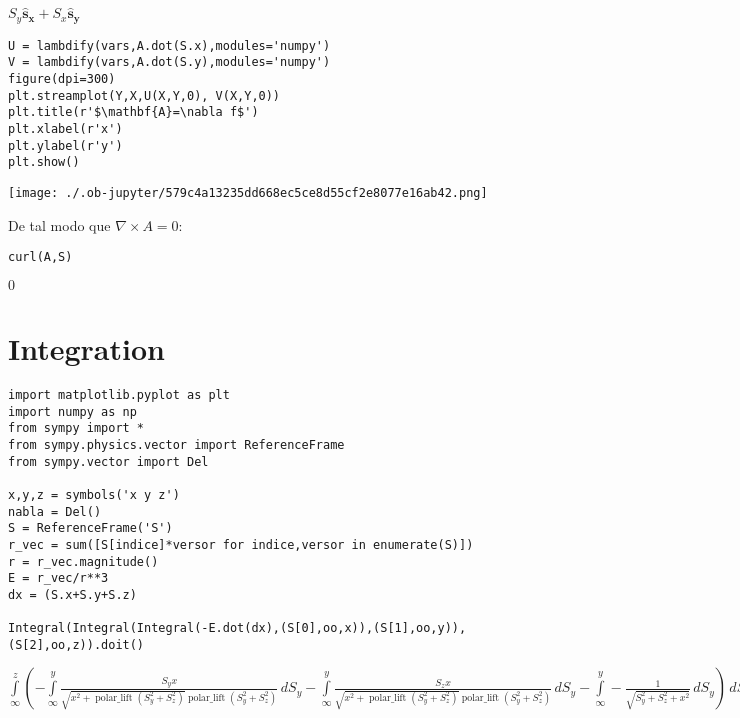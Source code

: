 \documentclass[11pt]{article}
\begin{document}
$\displaystyle S_{y}\mathbf{\hat{s}_x} + S_{x}\mathbf{\hat{s}_y}$

\begin{verbatim}
U = lambdify(vars,A.dot(S.x),modules='numpy')
V = lambdify(vars,A.dot(S.y),modules='numpy')
figure(dpi=300)
plt.streamplot(Y,X,U(X,Y,0), V(X,Y,0))
plt.title(r'$\mathbf{A}=\nabla f$')
plt.xlabel(r'x')
plt.ylabel(r'y')
plt.show()
\end{verbatim}

\begin{center}
\texttt{[image: ./.ob-jupyter/579c4a13235dd668ec5ce8d55cf2e8077e16ab42.png]}
\end{center}
De tal modo que \(\nabla\times A=0\):
\begin{verbatim}
curl(A,S)
\end{verbatim}

$\displaystyle 0$

\section{Integration}
\label{sec:org9652966}
\begin{verbatim}
import matplotlib.pyplot as plt
import numpy as np
from sympy import *
from sympy.physics.vector import ReferenceFrame
from sympy.vector import Del

x,y,z = symbols('x y z')
nabla = Del()
S = ReferenceFrame('S')
r_vec = sum([S[indice]*versor for indice,versor in enumerate(S)])
r = r_vec.magnitude()
E = r_vec/r**3
dx = (S.x+S.y+S.z)

Integral(Integral(Integral(-E.dot(dx),(S[0],oo,x)),(S[1],oo,y)),(S[2],oo,z)).doit()

\end{verbatim}

$\displaystyle \int\limits_{\infty}^{z} \left(- \int\limits_{\infty}^{y} \frac{S_{y} x}{\sqrt{x^{2} + \operatorname{polar\_lift}{\left(S_{y}^{2} + S_{z}^{2} \right)}} \operatorname{polar\_lift}{\left(S_{y}^{2} + S_{z}^{2} \right)}}\, dS_{y} - \int\limits_{\infty}^{y} \frac{S_{z} x}{\sqrt{x^{2} + \operatorname{polar\_lift}{\left(S_{y}^{2} + S_{z}^{2} \right)}} \operatorname{polar\_lift}{\left(S_{y}^{2} + S_{z}^{2} \right)}}\, dS_{y} - \int\limits_{\infty}^{y} - \frac{1}{\sqrt{S_{y}^{2} + S_{z}^{2} + x^{2}}}\, dS_{y}\right)\, dS_{z}$
\end{document}
